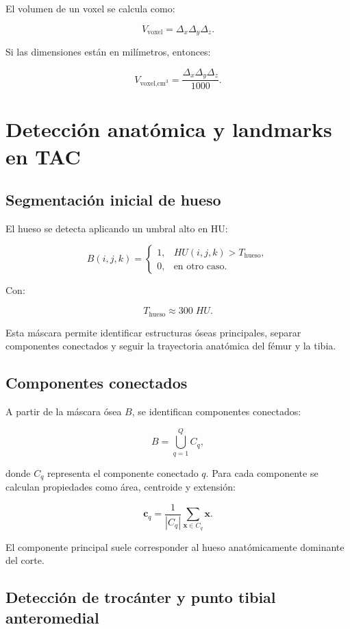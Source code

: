 \documentclass[12pt,a4paper]{article}
\begin{document}
El volumen de un voxel se calcula como:

\[
V_{\text{voxel}} = \Delta_x\Delta_y\Delta_z.
\]

Si las dimensiones están en milímetros, entonces:

\[
V_{\text{voxel,cm}^3} =
\frac{\Delta_x\Delta_y\Delta_z}{1000}.
\]

\section{Detección anatómica y landmarks en TAC}

\subsection{Segmentación inicial de hueso}

El hueso se detecta aplicando un umbral alto en HU:

\[
B(i,j,k)=
\begin{cases}
1, & HU(i,j,k)>T_{\text{hueso}},\\
0, & \text{en otro caso}.
\end{cases}
\]

Con:

\[
T_{\text{hueso}}\approx 300\;HU.
\]

Esta máscara permite identificar estructuras óseas principales, separar componentes conectados y seguir la trayectoria anatómica del fémur y la tibia.

\subsection{Componentes conectados}

A partir de la máscara ósea \(B\), se identifican componentes conectados:

\[
B = \bigcup_{q=1}^{Q} C_q,
\]

donde \(C_q\) representa el componente conectado \(q\). Para cada componente se calculan propiedades como área, centroide y extensión:

\[
\mathbf{c}_q =
\frac{1}{|C_q|}
\sum_{\mathbf{x}\in C_q}\mathbf{x}.
\]

El componente principal suele corresponder al hueso anatómicamente dominante del corte.

\subsection{Detección de trocánter y punto tibial anteromedial}
\end{document}
